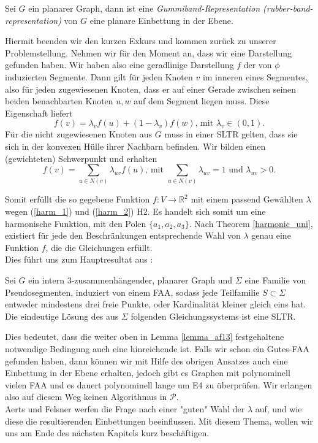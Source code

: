 \begin{theorem}
Sei $G$ ein planarer Graph, dann ist eine \textit{Gummiband-Representation (rubber-band-representation)} von $G$ eine planare Einbettung in der Ebene.
\end{theorem}

Hiermit beenden wir den kurzen Exkurs und kommen zurück zu unserer Problemstellung. Nehmen wir für den Moment an, dass wir eine Darstellung gefunden haben. Wir haben also eine geradlinige Darstellung $f$ der von $\phi$ induzierten Segmente. Dann gilt für jeden Knoten $v$ im inneren eines Segmentes, also für jeden zugewiesenen Knoten, dass er auf einer Gerade zwischen seinen beiden benachbarten Knoten $u,w$ auf dem Segment liegen muss. Diese Eigenschaft liefert
\begin{equation}\label{harm_1}
f(v) = \lambda_v f(u) + (1-\lambda_v)f(w) \text{, mit } \lambda_v \in (0,1).
\end{equation}
Für die nicht zugewiesenen Knoten aus $G$ muss in einer SLTR gelten, dass sie sich in der konvexen Hülle ihrer Nachbarn befinden. Wir bilden einen (gewichteten) Schwerpunkt und erhalten
\begin{equation}\label{harm_2}
f(v) = \sum_{u \in N(v)} \lambda_{uv} f(u) \text{, mit }  \sum_{u \in N(v)}\lambda_{uv} = 1 \text{ und } \lambda_{uv} > 0.
\end{equation}

Somit erfüllt die so gegebene Funktion $f:V\to\mathbb{R}^2$ mit einem passend Gewählten $\lambda$ wegen (\ref{harm_1}) und (\ref{harm_2}) H2. Es handelt sich somit um eine harmonische Funktion, mit den Polen $\{a_1,a_2,a_3\}$. Nach Theorem \ref{harmonic_uni}, existiert für jede den Beschränkungen entsprechende Wahl von $\lambda$ genau eine Funktion $f$, die die Gleichungen erfüllt.\\
Dies führt uns zum Hauptresultat aus \cite{af13}:

\begin{theorem}\label{com_theo}
Sei $G$ ein intern 3-zusammenhängender, planarer Graph und $\Sigma$ eine Familie von Pseudosegmenten, induziert von einem FAA, sodass jede Teilfamilie $S \subset \Sigma$ entweder mindestens drei freie Punkte, oder Kardinalität kleiner gleich eins hat. Die eindeutige Lösung des aus $\Sigma$ folgenden Gleichungssystems ist eine SLTR.
\end{theorem}

\begin{remark}
Dies bedeutet, dass die weiter oben in Lemma \ref{lemma_af13} festgehaltene notwendige Bedingung auch eine hinreichende ist. Falls wir schon ein Gutes-FAA gefunden haben, dann können wir mit Hilfe des obrigen Ansatzes auch eine Einbettung in der Ebene erhalten, jedoch gibt es Graphen mit polynominell vielen FAA und es dauert polynominell lange um E4 zu überprüfen. Wir erlangen also auf diesem Weg keinen Algorithmus in $\mathcal{P}$.\\
Aerts und Felsner werfen die Frage nach einer "guten" Wahl der $\lambda$ auf, und wie diese die resultierenden Einbettungen beeinflussen. Mit diesem Thema, wollen wir uns am Ende des nächsten Kapitels kurz beschäftigen.
\end{remark}

